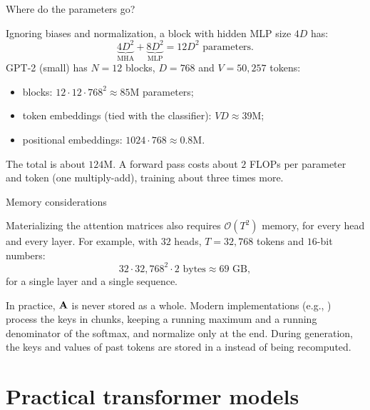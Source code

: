 \begin{frame}{Where do the parameters go?}
    \setlength{\parskip}{6pt}

    Ignoring biases and normalization, a block with hidden MLP size $4D$ has:
    \[
        \underbrace{4D^2}_{\text{MHA}}+\underbrace{8D^2}_{\text{MLP}}=12D^2
        \text{ parameters.}
    \]
    GPT-2 (small) has $N=12$ blocks, $D=768$ and $V=50{,}257$ tokens:
    \begin{itemize}
        \item blocks: $12\cdot12\cdot768^2\approx 85$M parameters;
        \item token embeddings (tied with the classifier): $V D\approx 39$M;
        \item positional embeddings: $1024\cdot768\approx0.8$M.
    \end{itemize}
    The total is about $124$M. A forward pass costs about $2$ FLOPs per
    parameter and token (one multiply-add), training about three times more.


\end{frame}

\begin{frame}{Memory considerations}
    \setlength{\parskip}{6pt}

    Materializing the attention matrices also requires $\mathcal{O}(T^2)$
    memory, for every head and every layer. For example, with $32$ heads,
    $T=32{,}768$ tokens and $16$-bit numbers:
    \[
        32\cdot 32{,}768^2\cdot 2\text{ bytes}\approx 69\text{ GB},
    \]
    for a single layer and a single sequence.

    In practice, $\boldsymbol{\mathbf{A}}$ is never stored as a whole. Modern implementations
    (e.g., ) process the keys in chunks, keeping a
    running maximum and a running denominator of the softmax, and normalize
    only at the end. During generation, the keys and values of past tokens
    are stored in a  instead of being recomputed.

\end{frame}

\section{Practical transformer models}
